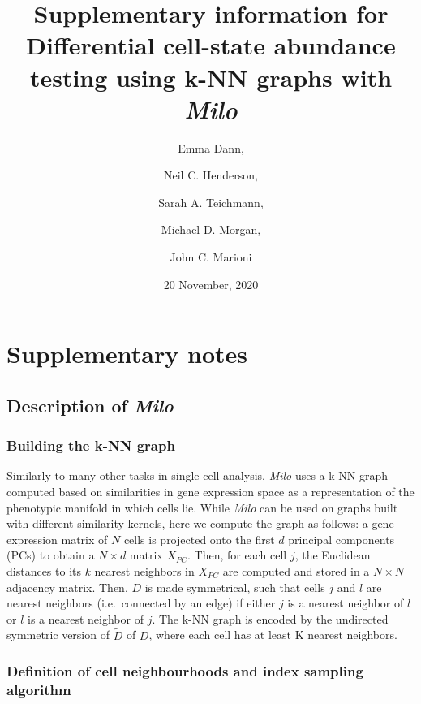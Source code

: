 \documentclass[
]{article}
\title{Supplementary information for
\textbf{Differential cell-state abundance testing using k-NN graphs with \emph{Milo}}}
\author{Emma Dann, \and Neil C. Henderson, \and Sarah A. Teichmann, \and Michael D. Morgan, \and John C. Marioni}
\date{20 November, 2020}
\begin{document}
\maketitle

{
\setcounter{tocdepth}{3}
\tableofcontents
}
\renewcommand{\figurename}{Supplementary Figure}

\newpage

\hypertarget{supplementary-notes}{%
\section{Supplementary notes}\label{supplementary-notes}}

\hypertarget{description-of-milo}{%
\subsection{\texorpdfstring{Description of \emph{Milo}}{Description of Milo}}\label{description-of-milo}}

\hypertarget{building-the-k-nn-graph}{%
\subsubsection{Building the k-NN graph}\label{building-the-k-nn-graph}}

Similarly to many other tasks in single-cell analysis, \emph{Milo} uses a k-NN graph computed based on similarities in gene expression space as a representation of the phenotypic manifold in which cells lie. While \emph{Milo} can be used on graphs built with different similarity kernels, here we compute the graph as follows: a gene expression matrix of \(N\) cells is projected onto the first \(d\) principal components (PCs) to obtain a \(N \times d\) matrix \(X_{PC}\). Then, for each cell \(j\), the Euclidean distances to its \(k\) nearest neighbors in \(X_{PC}\) are computed and stored in a \(N \times N\) adjacency matrix. Then, \(D\) is made symmetrical, such that cells \(j\) and \(l\) are nearest neighbors (i.e.~connected by an edge) if either \(j\) is a nearest neighbor of \(l\) or \(l\) is a nearest neighbor of \(j\). The k-NN graph is encoded by the undirected symmetric version of \(\tilde{D}\) of \(D\), where each cell has at least K nearest neighbors.

\hypertarget{definition-of-cell-neighbourhoods-and-index-sampling-algorithm}{%
\subsubsection{Definition of cell neighbourhoods and index sampling algorithm}\label{definition-of-cell-neighbourhoods-and-index-sampling-algorithm}}
\end{document}
